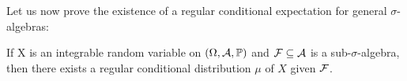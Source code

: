 Let us now prove the existence of a regular conditional expectation for general $\sigma$-algebras:
\begin{lsatz}
\begin{theorem}\label{existence_regular_dist}
	If X is an integrable random variable on  $(\Omega,\mathcal{A},\mathbb{P})$ and $\mathcal{F} \subseteq  \mathcal{A}$ is a sub-$\sigma$-algebra, then there exists a regular conditional distribution $\mu$ of $X$ given $\mathcal{F}$.
\end{theorem}
\end{lsatz}



